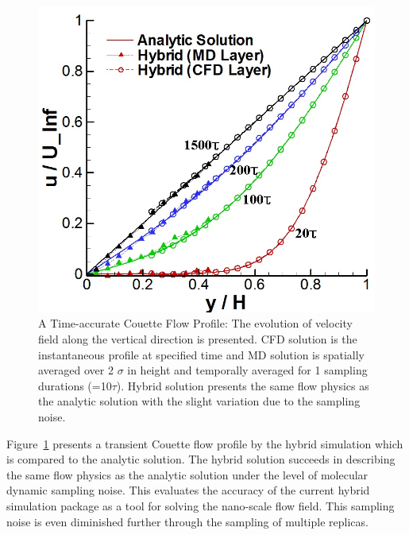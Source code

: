 \documentclass[]{aiaa-tc}%
\begin{document}
\begin{figure}
\includegraphics{Flat_Plate_Sol2.jpg}
\caption{A Time-accurate Couette Flow Profile: The evolution of velocity field 
along the vertical direction is presented. CFD solution is the instantaneous 
profile at specified time and MD solution is spatially averaged over 
2 $\sigma$ in height and temporally averaged for 1 sampling durations (=10$\tau$).
Hybrid solution presents the same flow physics as the analytic solution
with the slight variation due to the sampling noise.}
\label{Fig:Flat_Plate_Sol}
\end{figure}


Figure~\ref{Fig:Flat_Plate_Sol} presents a transient Couette flow profile 
by the hybrid simulation which is compared to the analytic solution. 
The hybrid solution succeeds in describing the same flow physics as the 
analytic solution under the level of molecular dynamic sampling noise.
This evaluates the accuracy of the current hybrid simulation package
as a tool for solving the nano-scale flow field. This sampling noise is 
even diminished further through the sampling of multiple replicas.\cite{JoCS2012}
\end{document}
